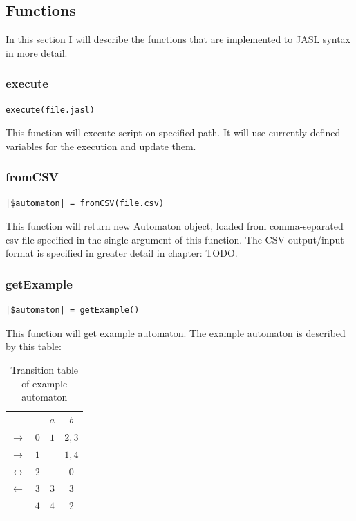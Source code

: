 \documentclass{ctuthesis}
\begin{document}
\subsection{Functions}
In this section I will describe the functions that are implemented to JASL syntax in more detail.

\subsubsection{execute}
\label{subsec:execute}
\begin{lstlisting}[language = JASL_snippet]
	execute(file.jasl)
\end{lstlisting}

This function will execute script on specified path. It will use currently defined variables for the execution and update them.

\subsubsection{fromCSV}
\begin{lstlisting}[language = JASL_snippet]
	|$automaton| = fromCSV(file.csv)
\end{lstlisting}

This function will return new Automaton object, loaded from comma-separated csv file specified in the single argument of this function. The CSV output/input format is specified in greater detail in chapter: TODO.

\subsubsection{getExample}
\begin{lstlisting}[language = JASL_snippet]
	|$automaton| = getExample()
\end{lstlisting}

This function will get example automaton. The example automaton is described by this table:
\begin{table}[H]
\begin{ctucolortab}
\begin{tabular}{cc|c|c}
	 & & $a$ & $b$ \\\Midrule
	$\rightarrow$ & $0$ & $1$ & $2,3$ \\
	$\rightarrow$ & $1$ & & $1,4$ \\
	$\leftrightarrow$ & $2$ & & $0$ \\
	$\leftarrow$ & $3$ & $3$ & $3$ \\
	 & $4$ & $4$ & $2$ 
\end{tabular}
\end{ctucolortab}
\caption{Transition table of example automaton}
\label{fig:example_automaton_table}
\end{table}
\end{document}
